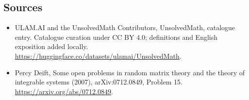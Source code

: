\documentclass[11pt]{article}
\begin{document}
\subsection{Sources}
\begin{itemize}
\item[\hypertarget{source:statement:1}{S1}] ULAM.AI and the UnsolvedMath Contributors, UnsolvedMath, catalogue entry. Catalogue curation under CC BY 4.0; definitions and English exposition added locally.
\url{https://huggingface.co/datasets/ulamai/UnsolvedMath}.
\item[\hypertarget{source:statement:2}{S2}] Percy Deift, Some open problems in random matrix theory and the theory of integrable systems (2007), arXiv:0712.0849, Problem 15.
\url{https://arxiv.org/abs/0712.0849}.
\end{itemize}
\label{end:statement}
\end{document}
